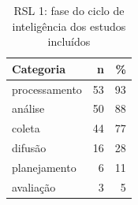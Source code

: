 \begin{table}[htbp]
\centering
\caption{RSL 1: fase do ciclo de inteligência dos estudos incluídos}
\label{tab:map-rsl1-fasedociclod}
\small
\begin{tabular}{p{8cm}rr}
\hline
\textbf{Categoria} & \textbf{n} & \textbf{\%} \\
\hline
processamento & 53 & 93 \\
análise & 50 & 88 \\
coleta & 44 & 77 \\
difusão & 16 & 28 \\
planejamento & 6 & 11 \\
avaliação & 3 & 5 \\
\hline
\end{tabular}
\end{table}
